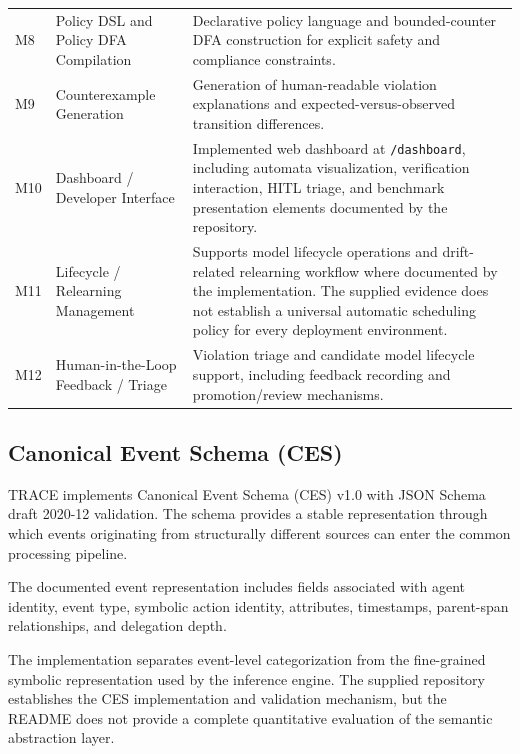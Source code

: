 \documentclass[11pt,a4paper]{article}
\begin{document}
\begin{longtable}{L{1.7cm} L{4.6cm} L{8.1cm}}
M8 &
Policy DSL and Policy DFA Compilation &
Declarative policy language and bounded-counter DFA construction for explicit safety and
compliance constraints. \\

M9 &
Counterexample Generation &
Generation of human-readable violation explanations and expected-versus-observed
transition differences. \\

M10 &
Dashboard / Developer Interface &
Implemented web dashboard at \texttt{/dashboard}, including automata visualization,
verification interaction, HITL triage, and benchmark presentation elements documented
by the repository. \\

M11 &
Lifecycle / Relearning Management &
Supports model lifecycle operations and drift-related relearning workflow where
documented by the implementation. The supplied evidence does not establish a universal
automatic scheduling policy for every deployment environment. \\

M12 &
Human-in-the-Loop Feedback / Triage &
Violation triage and candidate model lifecycle support, including feedback recording
and promotion/review mechanisms. \\

\end{longtable}

\subsection{Canonical Event Schema (CES)}

TRACE implements Canonical Event Schema (CES) v1.0 with JSON Schema draft 2020-12
validation. The schema provides a stable representation through which events originating
from structurally different sources can enter the common processing pipeline.

The documented event representation includes fields associated with agent identity,
event type, symbolic action identity, attributes, timestamps, parent-span relationships,
and delegation depth.

The implementation separates event-level categorization from the fine-grained symbolic
representation used by the inference engine. The supplied repository establishes the
CES implementation and validation mechanism, but the README does not provide a complete
quantitative evaluation of the semantic abstraction layer.
\end{document}
